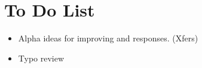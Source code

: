 \documentclass[tom-jenni]{subfile}
\begin{document}
	
	\chapter{To Do List}
	
	\begin{itemize}
		\item Alpha ideas for improving  and  responses.  (Xfers)
		\item Typo review
	\end{itemize}

	
\end{document}
